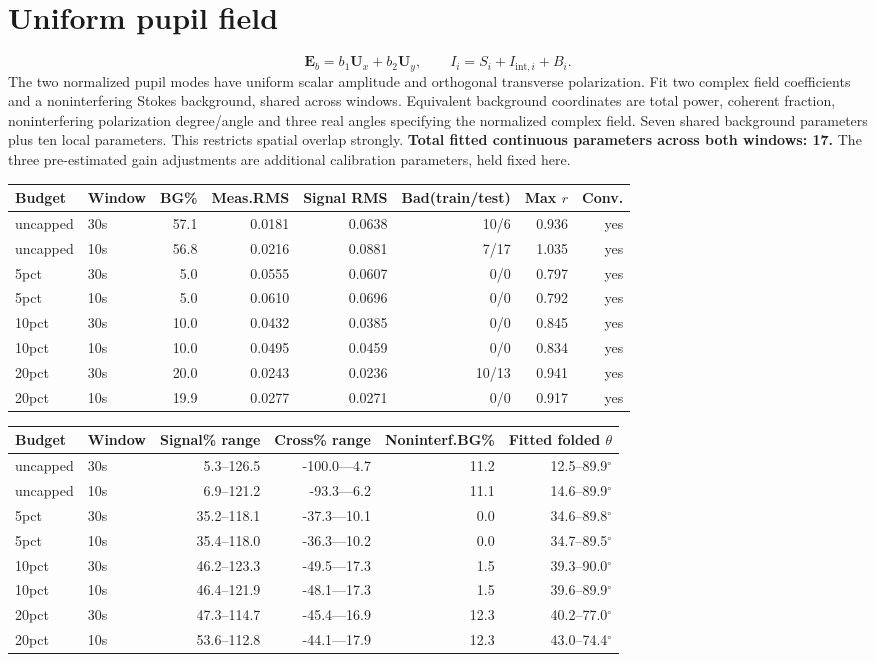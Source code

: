 \documentclass[10pt,a4paper]{article}
\begin{document}
\section{Uniform pupil field}
\[\mathbf{E}_b=b_1\mathbf{U}_x+b_2\mathbf{U}_y,\qquad I_i=S_i+I_{\mathrm{int},i}+B_i.\]
The two normalized pupil modes have uniform scalar amplitude and orthogonal transverse polarization. Fit two complex field coefficients and a noninterfering Stokes background, shared across windows. Equivalent background coordinates are total power, coherent fraction, noninterfering polarization degree/angle and three real angles specifying the normalized complex field. Seven shared background parameters plus ten local parameters. This restricts spatial overlap strongly.
\textbf{Total fitted continuous parameters across both windows: 17.} The three pre-estimated gain adjustments are additional calibration parameters, held fixed here.
\begin{longtable}{llrrrrrr}\toprule
Budget & Window & BG\% & Meas.RMS & Signal RMS & Bad(train/test) & Max $r$ & Conv.\\\midrule\endhead
uncapped & 30s & 57.1 & 0.0181 & 0.0638 & 10/6 & 0.936 & yes \\
uncapped & 10s & 56.8 & 0.0216 & 0.0881 & 7/17 & 1.035 & yes \\
5pct & 30s & 5.0 & 0.0555 & 0.0607 & 0/0 & 0.797 & yes \\
5pct & 10s & 5.0 & 0.0610 & 0.0696 & 0/0 & 0.792 & yes \\
10pct & 30s & 10.0 & 0.0432 & 0.0385 & 0/0 & 0.845 & yes \\
10pct & 10s & 10.0 & 0.0495 & 0.0459 & 0/0 & 0.834 & yes \\
20pct & 30s & 20.0 & 0.0243 & 0.0236 & 10/13 & 0.941 & yes \\
20pct & 10s & 19.9 & 0.0277 & 0.0271 & 0/0 & 0.917 & yes \\
\bottomrule\end{longtable}
\begin{longtable}{llrrrr}\toprule
Budget & Window & Signal\% range & Cross\% range & Noninterf.BG\% & Fitted folded $\theta$\\\midrule\endhead
uncapped & 30s & 5.3--126.5 & -100.0---4.7 & 11.2 & 12.5--89.9$^\circ$ \\
uncapped & 10s & 6.9--121.2 & -93.3---6.2 & 11.1 & 14.6--89.9$^\circ$ \\
5pct & 30s & 35.2--118.1 & -37.3---10.1 & 0.0 & 34.6--89.8$^\circ$ \\
5pct & 10s & 35.4--118.0 & -36.3---10.2 & 0.0 & 34.7--89.5$^\circ$ \\
10pct & 30s & 46.2--123.3 & -49.5---17.3 & 1.5 & 39.3--90.0$^\circ$ \\
10pct & 10s & 46.4--121.9 & -48.1---17.3 & 1.5 & 39.6--89.9$^\circ$ \\
20pct & 30s & 47.3--114.7 & -45.4---16.9 & 12.3 & 40.2--77.0$^\circ$ \\
20pct & 10s & 53.6--112.8 & -44.1---17.9 & 12.3 & 43.0--74.4$^\circ$ \\
\bottomrule\end{longtable}
\end{document}
